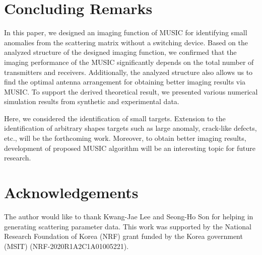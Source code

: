 \documentclass[3p,10pt]{elsarticle}
\theoremstyle{plain}
\theoremstyle{remark}
\begin{document}
\section{Concluding Remarks}\label{sec:6}
In this paper, we designed an imaging function of MUSIC for identifying small anomalies from the scattering matrix without a switching device. Based on the analyzed structure of the designed imaging function, we confirmed that the imaging performance of the MUSIC significantly depends on the total number of transmitters and receivers. Additionally, the analyzed structure also allows us to find the optimal antenna arrangement for obtaining better imaging results via MUSIC. To support the derived theoretical result, we presented various numerical simulation results from synthetic and experimental data.

Here, we considered the identification of small targets. Extension to the identification of arbitrary shapes targets such as large anomaly, crack-like defects, etc., will be the forthcoming work. Moreover, to obtain better imaging results, development of proposed MUSIC algorithm will be an interesting topic for future research.

\section*{Acknowledgements}
The author would like to thank Kwang-Jae Lee and Seong-Ho Son for helping in generating scattering parameter data. This work was supported by the National Research Foundation of Korea (NRF) grant funded by the Korea government (MSIT) (NRF-2020R1A2C1A01005221).






\end{document}
